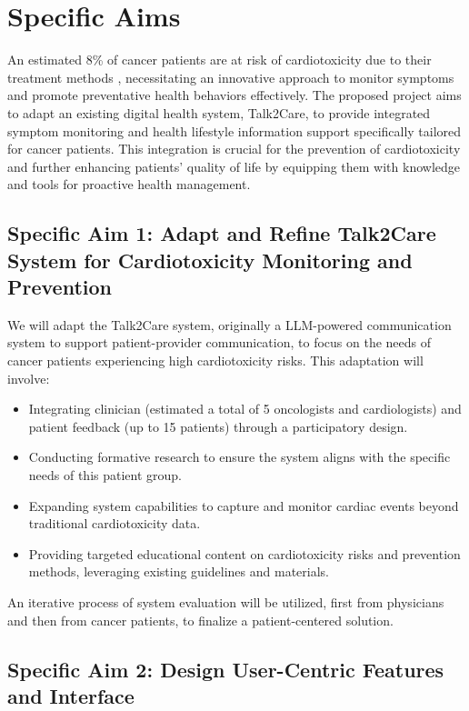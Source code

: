 \documentclass[11pt]{article}
\begin{document}
{
  \hfill
  \textbf{}
  \hfill
}

\section*{Specific Aims}

An estimated 8\% of cancer patients are at risk of cardiotoxicity due to their treatment methods \cite{limaCardiotoxicityCancerPatients2022}, necessitating an innovative approach to monitor symptoms and promote preventative health behaviors effectively. The proposed project aims to adapt an existing digital health system, Talk2Care, to provide integrated symptom monitoring and health lifestyle information support specifically tailored for cancer patients. This integration is crucial for the prevention of cardiotoxicity and further enhancing patients' quality of life by equipping them with knowledge and tools for proactive health management.

\subsection*{Specific Aim 1: Adapt and Refine Talk2Care System for Cardiotoxicity Monitoring and Prevention} 
We will adapt the Talk2Care system, originally a LLM-powered communication system to support patient-provider communication, to focus on the needs of cancer patients experiencing high cardiotoxicity risks. This adaptation will involve: 
\begin{itemize}[topsep=0pt,itemsep=0pt,parsep=0pt]
  \item Integrating clinician (estimated a total of 5 oncologists and cardiologists) and patient feedback (up to 15 patients) through a participatory design. 
  \item Conducting formative research to ensure the system aligns with the specific needs of this patient group. 
  \item Expanding system capabilities to capture and monitor cardiac events beyond traditional cardiotoxicity data. 
  \item Providing targeted educational content on cardiotoxicity risks and prevention methods, leveraging existing guidelines and materials. 
\end{itemize} 
An iterative process of system evaluation will be utilized, first from physicians and then from cancer patients, to finalize a patient-centered solution.

\subsection*{Specific Aim 2: Design User-Centric Features and Interface}
\end{document}
